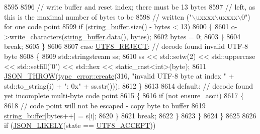 \begin{DoxyCode}
{{8595 
8596                     \textcolor{comment}{// write buffer and reset index; there must be 13 bytes}
8597                     \textcolor{comment}{// left, as this is the maximal number of bytes to be}
8598                     \textcolor{comment}{// written ("\(\backslash\)uxxxx\(\backslash\)uxxxx\(\backslash\)0") for one code point}
8599                     \textcolor{keywordflow}{if} (\hyperlink{classnlohmann_1_1detail_1_1serializer_a9c9b7ca63a66e59e5e7ffe8a2acf5c8f}{string\_buffer}.size() - bytes < 13)
8600                     \{
8601                         \hyperlink{classnlohmann_1_1detail_1_1serializer_acf3c88660d3cbc65fc71c4d84f2a9f59}{o}->write\_characters(\hyperlink{classnlohmann_1_1detail_1_1serializer_a9c9b7ca63a66e59e5e7ffe8a2acf5c8f}{string\_buffer}.data(), bytes);
8602                         bytes = 0;
8603                     \}
8604                     \textcolor{keywordflow}{break};
8605                 \}
8606 
8607                 \textcolor{keywordflow}{case} \hyperlink{classnlohmann_1_1detail_1_1serializer_a6bcc08c64319454fb9d72c3f438efee1}{UTF8\_REJECT}:  \textcolor{comment}{// decode found invalid UTF-8 byte}
8608                 \{
8609                     std::stringstream ss;
8610                     ss << std::setw(2) << std::uppercase << std::setfill('0') << std::hex <<
       static\_cast<int>(byte);
8611                     \hyperlink{json_8hpp_a6c274f6db2e65c1b66c7d41b06ad690f}{JSON\_THROW}(\hyperlink{classnlohmann_1_1detail_1_1type__error_aecc083aea4b698c33d042670ba50c10f}{type\_error::create}(316, \textcolor{stringliteral}{"invalid UTF-8 byte at
       index "} + std::to\_string(i) + \textcolor{stringliteral}{": 0x"} + ss.str()));
8612                 \}
8613 
8614                 \textcolor{keywordflow}{default}:  \textcolor{comment}{// decode found yet incomplete multi-byte code point}
8615                 \{
8616                     \textcolor{keywordflow}{if} (not ensure\_ascii)
8617                     \{
8618                         \textcolor{comment}{// code point will not be escaped - copy byte to buffer}
8619                         \hyperlink{classnlohmann_1_1detail_1_1serializer_a9c9b7ca63a66e59e5e7ffe8a2acf5c8f}{string\_buffer}[bytes++] = s[i];
8620                     \}
8621                     \textcolor{keywordflow}{break};
8622                 \}
8623             \}
8624         \}
8625 
8626         \textcolor{keywordflow}{if} (\hyperlink{json_8hpp_a41ecd1c4cf7c3d56477b9b685b5daa72}{JSON\_LIKELY}(state == \hyperlink{classnlohmann_1_1detail_1_1serializer_a52898111c3bbd130b2481dbef93c7292}{UTF8\_ACCEPT}))
}}
\end{DoxyCode}

